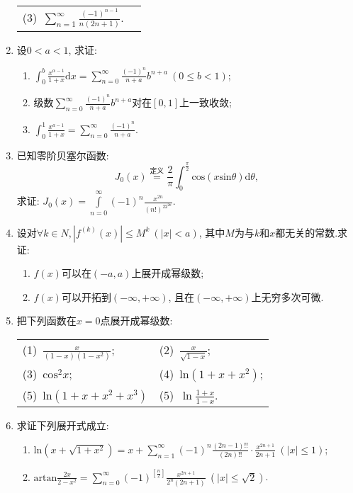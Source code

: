 \begin{enumerate}
\begin{table}[H]
\begin{tabular}{ll}
			(3)\ $\sum\limits_{n=1}^{\infty}\frac{(-1)^{n-1}}{n(2n+1)}$.
	\end{tabular}
	\end{table}
\item 设$0<a<1$, 求证:
\begin{enumerate}
\item $\displaystyle{\int_{0}^{b}\frac{x^{\alpha-1}}{1+x}\mathrm{d}x=\sum\limits_{n=0}^{\infty}\frac{(-1)^n}{n+a}b^{n+a}}\ (0\le b<1)$;
\item 级数$\sum\limits_{n=0}^{\infty}\frac{(-1)^n}{n+a}b^{n+a}$对在$[0,1]$上一致收敛;
\item $\displaystyle{\int_{0}^{1}\frac{x^{a-1}}{1+x}=\sum\limits_{n=0}^{\infty}\frac{(-1)^n}{n+a}}$.
\end{enumerate}
\item 已知零阶贝塞尔函数:
	$$ J_0(x) \overset{\text{定义}}{=}\frac{2}{\pi}\int_{0}^{\frac{\pi}{2}}\mathrm{cos}(x\mathrm{sin}\theta)\mathrm{d}\theta,$$
	求证: $J_0(x)=\int\limits_{n=0}^{\infty}(-1)^n\frac{x^{2n}}{(n!)^22^{2n}}$.
	\item 设对$\forall k \in N, |f^{(k)}(x)|\le M^k\ (|x|<a)$, 其中$M$为与$k$和$x$都无关的常数.求证:
	\begin{enumerate}
		\item $f(x)$可以在$(-a,a)$上展开成幂级数;
		\item $f(x)$可以开拓到$(-\infty,+\infty)$, 且在$(-\infty,+\infty)$上无穷多次可微.
	\end{enumerate}
\item 把下列函数在$x=0$点展开成幂级数:
\begin{table}[H]
	\begin{tabular}{ll}
		(1)\ $\frac{x}{(1-x)(1-x^2)}$;\qquad \qquad \qquad \qquad \qquad &(2)\ $\frac{x}{\sqrt{1-x}}$;\\
		(3)\ $\mathrm{cos}^2x$;\qquad \qquad \qquad \qquad \qquad &(4)\ $\mathrm{ln}(1+x+x^2)$;\\
		(5)\ $\mathrm{ln}(1+x+x^2+x^3)$\qquad \qquad \qquad \qquad \qquad &(5)\ $\mathrm{\ln}\frac{1+x}{1-x}$.
	\end{tabular}
\end{table}
\item 求证下列展开式成立:
\begin{enumerate}
	\item $\mathrm{ln}(x+\sqrt{1+x^2})=x+\sum\limits_{n=1}^{\infty}(-1)^n\frac{(2n-1)!!}{(2n)!!}\cdot\frac{x^{2n+1}}{2n+1}\ (|x|\le 1)$;
	\item $\mathrm{artan}\frac{2x}{2-x^2}=\sum\limits_{n=0}^{\infty}(-1)^{[\frac{n}{2}]}\frac{x^{2n+1}}{2^n(2n+1)}\ (|x|\le \sqrt{2})$.

\end{enumerate}
\end{enumerate}
